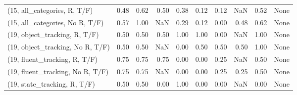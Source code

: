 \begin{table*}[h!]
\begin{adjustbox}{width=2\columnwidth,center}
\begin{tabular}{lrrr|rrr|rrr}
(15, all\_categories, R, T/F)          &                      0.48 &                  0.62 &                      0.50 &                          0.38 &                      0.12 &                          0.12 &                                    NaN &                               0.52 &                                  None \\
(15, all\_categories, No R, T/F)       &                      0.57 &                  1.00 &                       NaN &                          0.29 &                      0.12 &                          0.00 &                                   0.48 &                               0.62 &                                  None \\



\midrule
(19, object\_tracking, R, T/F)         &                      0.50 &                  0.50 &                      0.50 &                          1.00 &                      1.00 &                          0.00 &                                    NaN &                               1.00 &                                  None \\
(19, object\_tracking, No R, T/F)      &                      0.50 &                  0.50 &                       NaN &                          0.00 &                      0.50 &                          0.50 &                                   0.50 &                               1.00 &                                  None \\
(19, fluent\_tracking, R, T/F)         &                      0.75 &                  0.75 &                      0.75 &                          0.00 &                      0.00 &                          0.25 &                                    NaN &                               0.50 &                                  None \\
(19, fluent\_tracking, No R, T/F)      &                      0.75 &                  0.75 &                       NaN &                          0.00 &                      0.00 &                          0.25 &                                   0.25 &                               0.50 &                                  None \\
(19, state\_tracking, R, T/F)          &                      0.50 &                  0.50 &                      0.00 &                          1.00 &                      0.00 &                          0.00 &                                    NaN &                               0.00 &                                  None \\

\end{tabular}
\end{adjustbox}
\end{table*}
